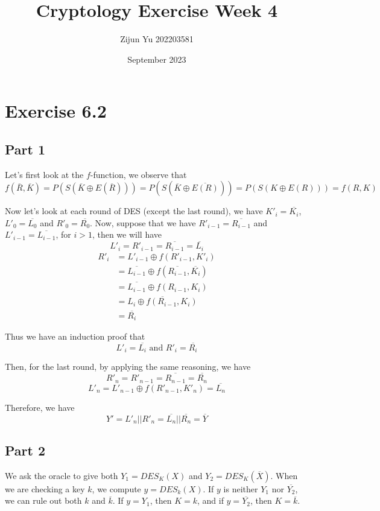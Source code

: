 \documentclass{article}
\title{Cryptology Exercise Week 4}
\author{Zijun Yu 202203581}
\date{September 2023}
\begin{document}
\maketitle

\section*{Exercise 6.2}

\subsection*{Part 1}

Let's first look at the $f$-function, we observe that
$$
    f(\overline{R}, \overline{K}) = P(S(\overline{K} \oplus E(\overline{R})))
    = P(S(\overline{K} \oplus \overline{E(R)})) = P(S(K \oplus E(R))) = f(R,K)
$$

Now let's look at each round of DES (except the last round), we have
$K'_i = \overline{K_i}$, $L'_0 = \overline{L_0}$ and $R'_0 = \overline{R_0}$.
Now, suppose that we have
$R'_{i-1} = \overline{R_{i-1}}$ and $L'_{i-1} = \overline{L_{i-1}}$,
for $i>1$, then we will have
$$L'_i = R'_{i-1} = \overline{R_{i-1}} = \overline{L_i}$$
\begin{equation*}
    \begin{split}
        R'_i & = L'_{i-1} \oplus f(R'_{i-1}, K'_i) \\
        & = \overline{L_{i-1}} \oplus f(\overline{R_{i-1}}, \overline{K_i}) \\
        & = \overline{L_{i-1}} \oplus f(R_{i-1}, K_i) \\
        & = \overline{L_i \oplus f(R_{i-1}, K_i)} \\
        & = \overline{R_i}
    \end{split}
\end{equation*}

Thus we have an induction proof that
$$
    L'_i = \overline{L_i} \text{ and } R'_i = \overline{R_i}
$$

Then, for the last round, by applying the same reasoning, we have
$$
    R'_{n} = R'_{n-1} = \overline{R_{n-1}} = \overline{R_n}
$$
$$
    L'_{n} = L'_{n-1} \oplus f(R'_{n-1}, K'_n) = \overline{L_{n}}
$$

Therefore, we have
$$
    Y' = L'_n || R'_n = \overline{L_n} || \overline{R_n} = \overline{Y}
$$

\subsection*{Part 2}

We ask the oracle to give both $Y_1 = DES_K(X)$ and $Y_2 = DES_K(\overline{X})$.
When we are checking a key $k$, we compute $y = DES_k(X)$. If $y$
is neither $Y_1$ nor $\overline{Y_2}$, we can rule out both $k$ and $\overline{k}$.
If $y = Y_1$, then $K=k$, and if $y=\overline{Y_2}$, then $K=\overline{k}$.
\end{document}
